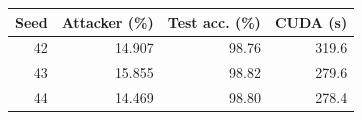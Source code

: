 \begin{tabular}{rrrr}
\toprule
Seed & Attacker (\%) & Test acc. (\%) & CUDA (s) \\
\midrule
42 & 14.907 & 98.76 & 319.6 \\
43 & 15.855 & 98.82 & 279.6 \\
44 & 14.469 & 98.80 & 278.4 \\
\bottomrule
\end{tabular}

